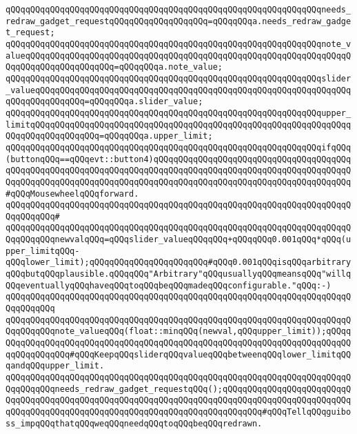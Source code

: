 \verb|qQQqqQQqqQQqqQQqqQQqqQQqqQQqqQQqqQQqqQQqqQQqqQQqqQQqqQQqqQQqqQQqneeds_redraw_gadget_requestqQQqqQQqqQQqqQQqqQQq=qQQqqQQqa.needs_redraw_gadget_request;|\newline
\verb|qQQqqQQqqQQqqQQqqQQqqQQqqQQqqQQqqQQqqQQqqQQqqQQqqQQqqQQqqQQqqQQqnote_valueqQQqqQQqqQQqqQQqqQQqqQQqqQQqqQQqqQQqqQQqqQQqqQQqqQQqqQQqqQQqqQQqqQQqqQQqqQQqqQQqqQQqqQQq=qQQqqQQqa.note_value;|\newline
\verb|qQQqqQQqqQQqqQQqqQQqqQQqqQQqqQQqqQQqqQQqqQQqqQQqqQQqqQQqqQQqqQQqslider_valueqQQqqQQqqQQqqQQqqQQqqQQqqQQqqQQqqQQqqQQqqQQqqQQqqQQqqQQqqQQqqQQqqQQqqQQqqQQqqQQq=qQQqqQQqa.slider_value;|\newline
\verb|qQQqqQQqqQQqqQQqqQQqqQQqqQQqqQQqqQQqqQQqqQQqqQQqqQQqqQQqqQQqqQQqupper_limitqQQqqQQqqQQqqQQqqQQqqQQqqQQqqQQqqQQqqQQqqQQqqQQqqQQqqQQqqQQqqQQqqQQqqQQqqQQqqQQqqQQq=qQQqqQQqa.upper_limit;|\newline
\newline
\verb|qQQqqQQqqQQqqQQqqQQqqQQqqQQqqQQqqQQqqQQqqQQqqQQqqQQqqQQqqQQqqQQqifqQQq(buttonqQQq==qQQqevt::button4)qQQqqQQqqQQqqQQqqQQqqQQqqQQqqQQqqQQqqQQqqQQqqQQqqQQqqQQqqQQqqQQqqQQqqQQqqQQqqQQqqQQqqQQqqQQqqQQqqQQqqQQqqQQqqQQqqQQqqQQqqQQqqQQqqQQqqQQqqQQqqQQqqQQqqQQqqQQqqQQqqQQqqQQqqQQqqQQqqQQq#qQQqMousewheelqQQqforward.|\newline
\verb|qQQqqQQqqQQqqQQqqQQqqQQqqQQqqQQqqQQqqQQqqQQqqQQqqQQqqQQqqQQqqQQqqQQqqQQqqQQqqQQq#|\newline
\verb|qQQqqQQqqQQqqQQqqQQqqQQqqQQqqQQqqQQqqQQqqQQqqQQqqQQqqQQqqQQqqQQqqQQqqQQqqQQqqQQqnewvalqQQq=qQQqslider_valueqQQqqQQq+qQQqqQQq0.001qQQq*qQQq(upper_limitqQQq-qQQqlower_limit);qQQqqQQqqQQqqQQqqQQqqQQq#qQQq0.001qQQqisqQQqarbitraryqQQqbutqQQqplausible.qQQqqQQq"Arbitrary"qQQqusuallyqQQqmeansqQQq"willqQQqeventuallyqQQqhaveqQQqtoqQQqbeqQQqmadeqQQqconfigurable."qQQq:-)|\newline
\verb|qQQqqQQqqQQqqQQqqQQqqQQqqQQqqQQqqQQqqQQqqQQqqQQqqQQqqQQqqQQqqQQqqQQqqQQqqQQqqQQq|\newline
\verb|qQQqqQQqqQQqqQQqqQQqqQQqqQQqqQQqqQQqqQQqqQQqqQQqqQQqqQQqqQQqqQQqqQQqqQQqqQQqqQQqnote_valueqQQq(float::minqQQq(newval,qQQqupper_limit));qQQqqQQqqQQqqQQqqQQqqQQqqQQqqQQqqQQqqQQqqQQqqQQqqQQqqQQqqQQqqQQqqQQqqQQqqQQqqQQqqQQqqQQq#qQQqKeepqQQqsliderqQQqvalueqQQqbetweenqQQqlower_limitqQQqandqQQqupper_limit.|\newline
\newline
\verb|qQQqqQQqqQQqqQQqqQQqqQQqqQQqqQQqqQQqqQQqqQQqqQQqqQQqqQQqqQQqqQQqqQQqqQQqqQQqqQQqneeds_redraw_gadget_requestqQQq();qQQqqQQqqQQqqQQqqQQqqQQqqQQqqQQqqQQqqQQqqQQqqQQqqQQqqQQqqQQqqQQqqQQqqQQqqQQqqQQqqQQqqQQqqQQqqQQqqQQqqQQqqQQqqQQqqQQqqQQqqQQqqQQqqQQqqQQqqQQqqQQqqQQq#qQQqTellqQQqguiboss_impqQQqthatqQQqweqQQqneedqQQqtoqQQqbeqQQqredrawn.|\newline
